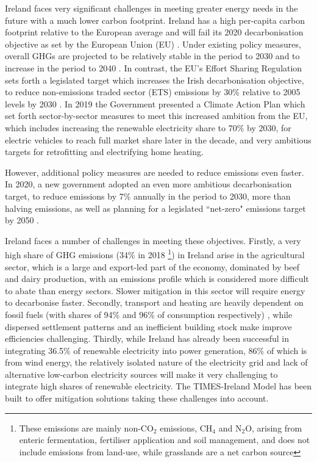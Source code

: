 \documentclass[journal abbreviation, manuscript]{copernicus}
\begin{document}
\introduction   %
Ireland faces very significant challenges in meeting greater energy needs in the future with a much lower carbon footprint. Ireland has a high per-capita carbon footprint relative to the European average and will fail its 2020 decarbonisation objective as set by the European Union (EU) \cite{DCCAE2019}. Under existing policy measures, overall GHGs are projected to be relatively stable in the period to 2030 and to increase in the period to 2040 \cite{EPA}. In contrast, the EU's Effort Sharing Regulation sets forth a legislated target which increases the Irish decarbonisation objective, to reduce non-emissions traded sector (ETS) emissions by 30\% relative to 2005 levels by 2030 \cite{CCAC2020}. In 2019 the Government presented a Climate Action Plan which set forth sector-by-sector measures to meet this increased ambition from the EU, which includes increasing the renewable electricity share to 70\% by 2030, for electric vehicles to reach full market share later in the decade, and very ambitious targets for retrofitting and electrifying home heating. 
 
However, additional policy measures are needed to reduce emissions even faster. In 2020, a new government adopted an even more ambitious decarbonisation target, to reduce emissions by 7\% annually in the period to 2030, more than halving emissions, as well as planning for a legislated ``net-zero" emissions target by 2050 \cite{DepartmentoftheTaoiseach2020}. 
 
Ireland faces a number of challenges in meeting these objectives. Firstly, a very high share of GHG emissions (34\% in 2018 \cite{EPA2019}\footnote{These emissions are mainly non-CO$_2$ emissions, CH$_4$ and N$_2$O, arising from enteric fermentation, fertiliser application and soil management, and does not include emissions from land-use, while grasslands are a net carbon source}) in Ireland arise in the agricultural sector, which is a large and export-led part of the economy, dominated by beef and dairy production, with an emissions profile which is considered more difficult to abate than energy sectors. Slower mitigation in this sector will require energy to decarbonise faster. Secondly, transport and heating are heavily dependent on fossil fuels (with shares of 94\% and 96\% of consumption respectively) \cite{SEAI2019}, while dispersed settlement patterns and an inefficient building stock make improve efficiencies challenging. Thirdly, while Ireland has already been successful in integrating 36.5\% of renewable electricity into power generation, 86\% of which is from wind energy, the relatively isolated nature of the electricity grid and lack of alternative low-carbon electricity sources will make it very challenging to integrate high shares of renewable electricity. The TIMES-Ireland Model has been built to offer mitigation solutions taking these challenges into account.
\end{document}
